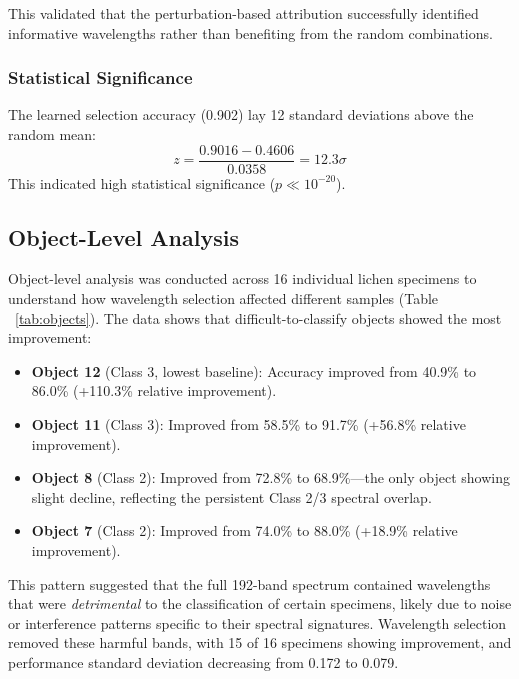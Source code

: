 This validated that the perturbation-based attribution successfully identified informative wavelengths rather than benefiting from the random combinations.

\subsubsection{Statistical Significance}
The learned selection accuracy (0.902) lay 12 standard deviations above the random mean:
\begin{equation}
z = \frac{0.9016 - 0.4606}{0.0358} = 12.3\sigma
\end{equation}
This indicated high statistical significance ($p \ll 10^{-20}$).

\subsection{Object-Level Analysis}
\label{sec:results_objects}

Object-level analysis was conducted across 16 individual lichen specimens to understand how wavelength selection affected different samples (Table ~\ref{tab:objects}). 
The data shows that difficult-to-classify objects showed the most improvement:
\begin{itemize}
    \item \textbf{Object 12} (Class 3, lowest baseline): Accuracy improved from 40.9\% to 86.0\% (+110.3\% relative improvement).
    \item \textbf{Object 11} (Class 3): Improved from 58.5\% to 91.7\% (+56.8\% relative improvement).
    \item \textbf{Object 8} (Class 2): Improved from 72.8\% to 68.9\%---the only object showing slight decline, reflecting the persistent Class 2/3 spectral overlap.
    \item \textbf{Object 7} (Class 2): Improved from 74.0\% to 88.0\% (+18.9\% relative improvement).
\end{itemize}

This pattern suggested that the full 192-band spectrum contained wavelengths that were \emph{detrimental} to the classification of certain specimens, likely due to noise or interference patterns specific to their spectral signatures.
Wavelength selection removed these harmful bands, with 15 of 16 specimens showing improvement, and performance standard deviation decreasing from 0.172 to 0.079.


